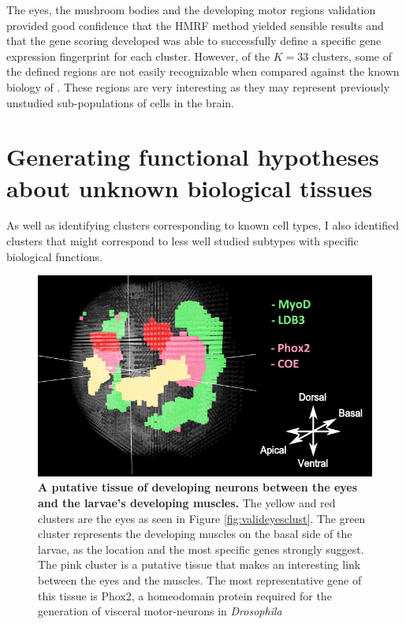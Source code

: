 	The eyes, the mushroom bodies and the developing motor regions validation provided good confidence that the HMRF method yielded sensible results and that the gene scoring developed was able to successfully define a specific gene expression fingerprint for each cluster. However, of the $K=33$ clusters, some of the defined regions are not easily recognizable when compared against the known biology of \platy{}. These regions are very interesting as they may represent previously unstudied sub-populations of cells in the brain. 



	\section{Generating functional hypotheses about unknown biological tissues}
	As well as identifying clusters corresponding to known cell types, I also identified clusters that might correspond to less well studied subtypes with specific biological functions. \\
	
	\begin{figure}[H]
\centerline{\includegraphics[width=0.8\linewidth]{gfx/chapter6/eyes_muscles.png}}
\caption{{\bf A putative tissue of developing neurons between the eyes and the larvae's developing muscles.} The yellow and red clusters are the eyes as seen in Figure \ref{fig:valideyesclust}. The green cluster represents the developing muscles on the basal side of the larvae, as the location and the most specific genes strongly suggest. The pink cluster is a putative tissue that makes an interesting link between the eyes and the muscles. The most representative gene of this tissue is Phox2, a homeodomain protein required for the generation of visceral motor-neurons in \emph{Drosophila} \cite{briscoe99}}
\label{fig:eyes_muscles}
	\end{figure}

